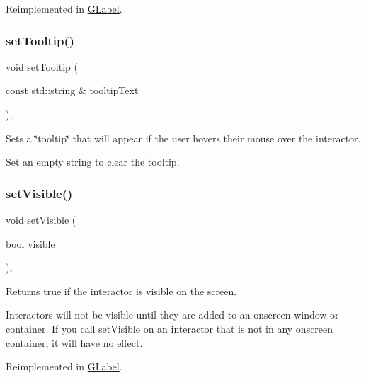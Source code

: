 Reimplemented in \mbox{\hyperlink{classGLabel_a0fe8cce1a80750f36fa14ee99ca34014}{G\+Label}}.

\mbox{\label{classGInteractor_a039e0e49beaecc275efce02d416acea8}} 
\subsubsection{\texorpdfstring{set\+Tooltip()}{setTooltip()}}
{\footnotesize\ttfamily void set\+Tooltip (\begin{DoxyParamCaption}\item[{const std\+::string \&}]{tooltip\+Text }\end{DoxyParamCaption})\hspace{0.3cm}{\ttfamily [virtual]}, {\ttfamily [inherited]}}



Sets a \char`\"{}tooltip\char`\"{} that will appear if the user hovers their mouse over the interactor. 

Set an empty string to clear the tooltip. \mbox{\label{classGInteractor_a18e44e30b31525a243960ca3928125aa}} 
\subsubsection{\texorpdfstring{set\+Visible()}{setVisible()}}
{\footnotesize\ttfamily void set\+Visible (\begin{DoxyParamCaption}\item[{bool}]{visible }\end{DoxyParamCaption})\hspace{0.3cm}{\ttfamily [virtual]}, {\ttfamily [inherited]}}



Returns true if the interactor is visible on the screen. 

Interactors will not be visible until they are added to an onscreen window or container. If you call set\+Visible on an interactor that is not in any onscreen container, it will have no effect. 

Reimplemented in \mbox{\hyperlink{classGLabel_a95c2a1221e6c59e9de544054963b4b18}{G\+Label}}.

\mbox{\label{classGInteractor_aa3f3fba4cb131baa8696ba01e3bceca1}} 
